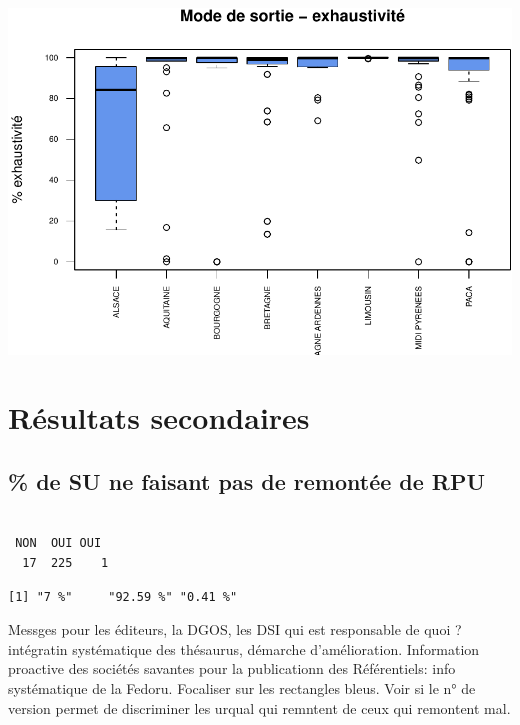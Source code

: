 \documentclass[]{article}
\begin{document}
\includegraphics{septembre2015_files/figure-latex/unnamed-chunk-31-1.pdf}

\section{Résultats secondaires}\label{resultats-secondaires}

\subsection{\% de SU ne faisant pas de remontée de
RPU}\label{de-su-ne-faisant-pas-de-remontee-de-rpu}

\begin{verbatim}

 NON  OUI OUI  
  17  225    1 
\end{verbatim}

\begin{verbatim}
[1] "7 %"     "92.59 %" "0.41 %" 
\end{verbatim}

Messges pour les éditeurs, la DGOS, les DSI qui est responsable de quoi
? intégratin systématique des thésaurus, démarche d'amélioration.
Information proactive des sociétés savantes pour la publicationn des
Référentiels: info systématique de la Fedoru. Focaliser sur les
rectangles bleus. Voir si le n° de version permet de discriminer les
urqual qui remntent de ceux qui remontent mal.
\end{document}
